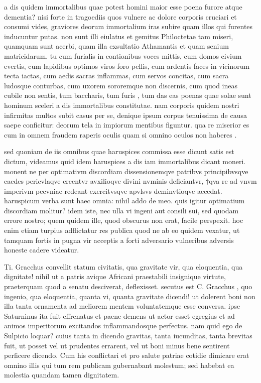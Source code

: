  a dis quidem immortalibus quae potest homini maior esse poena furore atque dementia? nisi forte in tragoediis quos vulnere ac dolore corporis cruciari et consumi vides, graviores deorum immortalium iras subire quam illos qui furentes inducuntur putas. non sunt illi eiulatus et gemitus Philoctetae tam miseri, quamquam sunt acerbi, quam illa exsultatio Athamantis et quam senium matricidarum. tu cum furialis in contionibus voces mittis, cum domos civium evertis, cum lapidibus optimos viros foro pellis, cum ardentis faces in vicinorum tecta iactas, cum aedis sacras inflammas, cum servos concitas, cum sacra ludosque conturbas, cum uxorem sororemque non discernis, cum quod ineas cubile non sentis, tum baccharis, tum furis , tum das eas poenas quae solae sunt hominum sceleri a dis immortalibus constitutae. nam corporis quidem nostri infirmitas multos subit casus per se, denique ipsum corpus tenuissima de causa saepe conficitur: deorum tela in impiorum mentibus figuntur. qua re miserior es cum in omnem fraudem raperis oculis quam si omnino oculos non haberes .

 sed quoniam de iis omnibus quae haruspices commissa esse dicunt satis est dictum, videamus quid idem haruspices a dis iam immortalibus dicant moneri. monent ne per optimativm discordiam dissensionemqve patribvs principibvsqve caedes pericvlaqve creentvr avxilioqve divini nvminis deficiantvr, †qva re ad vnvm imperivm pecvniae redeant exercitvsqve apvlsvs deminvtioqve accedat. haruspicum verba sunt haec omnia: nihil addo de meo. quis igitur optimatium discordiam molitur? idem iste, nec ulla vi ingeni aut consili sui, sed quodam errore nostro; quem quidem ille, quod obscurus non erat, facile perspexit. hoc enim etiam turpius adflictatur res publica quod ne ab eo quidem vexatur, ut tamquam fortis in pugna vir acceptis a forti adversario vulneribus adversis honeste cadere videatur.

 Ti. Gracchus convellit statum civitatis, qua gravitate vir, qua eloquentia, qua dignitate! nihil ut a patris avique Africani praestabili insignique virtute, praeterquam quod a senatu desciverat, deflexisset. secutus est C. Gracchus , quo ingenio, qua eloquentia, quanta vi, quanta gravitate dicendi! ut dolerent boni non illa tanta ornamenta ad meliorem mentem voluntatemque esse conversa. ipse Saturninus ita fuit effrenatus et paene demens ut actor esset egregius et ad animos imperitorum excitandos inflammandosque perfectus. nam quid ego de Sulpicio loquar? cuius tanta in dicendo gravitas, tanta iucunditas, tanta brevitas fuit, ut posset vel ut prudentes errarent, vel ut boni minus bene sentirent perficere dicendo. Cum his conflictari et pro salute patriae cotidie dimicare erat omnino illis qui tum rem publicam gubernabant molestum; sed habebat ea molestia quandam tamen dignitatem.

